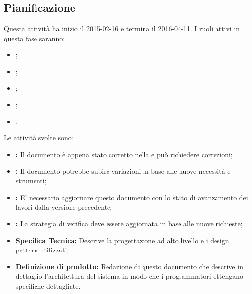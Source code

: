 \documentclass[12pt,a4paper]{article}
\begin{document}
\subsection{Pianificazione}

Questa attività ha inizio il 2015-02-16 e termina il 2016-04-11.
I ruoli attivi in questa fase saranno:

\begin{itemize}
\item \PM;
\item \AM;
\item \AN;
\item \PR;
\item \VR.
\end{itemize}

Le attività svolte sono:

\begin{itemize}
\item \textbf{\AdR:} 
Il documento è appena stato corretto nella \RR
e può richiedere correzioni;
\item \textbf{\NdP:}
Il documento potrebbe subire variazioni in base
alle nuove necessità e strumenti;
\item \textbf{\PdP:}
E' necessario aggiornare questo documento con lo stato di avanzamento
dei lavori dalla versione precedente;
\item \textbf{\PdQ:}
La strategia di verifica deve essere aggiornata in base 
alle nuove richieste;
\item \textbf{Specifica Tecnica:}
Descrive la progettazione ad alto livello e i design pattern
utilizzati;
\item \textbf{Definizione di prodotto:}
Redazione di questo documento che descrive in dettaglio l'architettura
del sistema in modo che i programmatori ottengano specifiche dettagliate.
\end{itemize}
\end{document}
